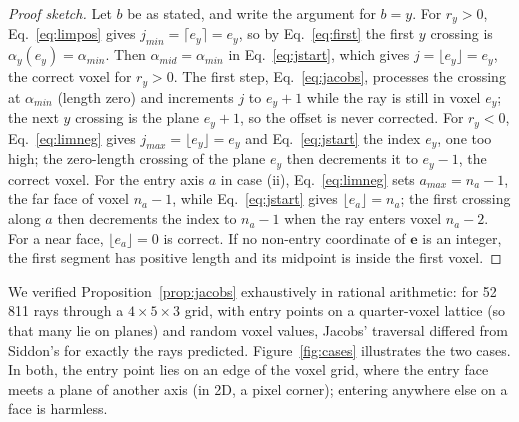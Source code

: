 \documentclass[11pt,a4paper]{article}
\theoremstyle{remark}
\newcommand{\e}{\mathbf{e}}
\begin{document}
\begin{proof}[Proof sketch]
Let $b$ be as stated, and write the argument for $b=y$. For $r_y>0$, Eq.~\eqref{eq:limpos} gives
$j_{min}=\lceil e_y\rceil=e_y$, so by Eq.~\eqref{eq:first} the first $y$ crossing is
$\alpha_y(e_y)=\alpha_{min}$. Then $\alpha_{mid}=\alpha_{min}$ in Eq.~\eqref{eq:jstart}, which gives
$j=\lfloor e_y\rfloor=e_y$, the correct voxel for $r_y>0$. The first step, Eq.~\eqref{eq:jacobs}, processes
the crossing at $\alpha_{min}$ (length zero) and increments $j$ to $e_y+1$ while the ray is still in voxel
$e_y$; the next $y$ crossing is the plane $e_y+1$, so the offset is never corrected. For $r_y<0$,
Eq.~\eqref{eq:limneg} gives $j_{max}=\lfloor e_y\rfloor=e_y$ and Eq.~\eqref{eq:jstart} the index $e_y$, one
too high; the zero-length crossing of the plane $e_y$ then decrements it to $e_y-1$, the correct voxel.
For the entry axis $a$ in case (ii), Eq.~\eqref{eq:limneg} sets $a_{max}=n_a-1$, the far face of voxel
$n_a-1$, while Eq.~\eqref{eq:jstart} gives $\lfloor e_a\rfloor=n_a$; the first crossing along $a$ then
decrements the index to $n_a-1$ when the ray enters voxel $n_a-2$. For a near face, $\lfloor e_a\rfloor=0$ is
correct. If no non-entry coordinate of $\e$ is an integer, the first segment has positive length and its
midpoint is inside the first voxel.
\end{proof}

We verified Proposition~\ref{prop:jacobs} exhaustively in rational arithmetic: for 52\,811 rays through a
$4\times5\times3$ grid, with entry points on a quarter-voxel lattice (so that many lie on planes) and
random voxel values, Jacobs' traversal differed from Siddon's for exactly the rays predicted.
Figure~\ref{fig:cases} illustrates the two cases. In both, the entry point lies on an edge of the voxel grid,
where the entry face meets a plane of another axis (in 2D, a pixel corner); entering anywhere else on a face
is harmless.
\end{document}
